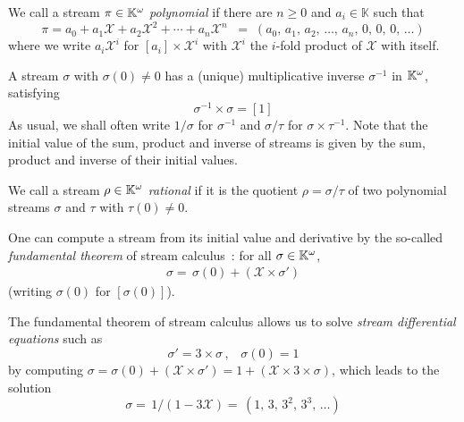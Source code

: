 \documentclass[3p]{elsarticle}
\newcommand{\X}{\mathcal{X}}           %
\newcommand{\streamproduct}{\times} %
\newcommand{\K}{\mathbb{K}}            %
\begin{document}
We call a stream $\pi \in \K\sp{\omega}$ {\em polynomial\/} if there
are $n \geq 0$ and $a_i \in \K$ such that
\[
\pi = a_0 + a_1 \X + a_2 \X^2 + \cdots + a_n  \X^n \;\; = \; (a_0,\,
a_1 ,\, a_2 ,\, \ldots ,\, a_n , \, 0, \, 0, \, 0, \, \ldots )
\]
where we write $a_i\X^i$ for $[a_i] \streamproduct \X^i$ with $\X^i$
the $i$-fold product of $\X$ with itself.

A stream $\sigma$ with $\sigma(0)\neq 0$ has a (unique)
multiplicative inverse $\sigma^{-1}$ in $\K\sp{\omega}$, satisfying
\[
\sigma^{-1} \streamproduct \sigma = [1]
\]
As usual, we shall often write $1/\sigma$ for $\sigma^{-1}$ and
$\sigma / \tau$ for $\sigma \streamproduct \tau^{-1}$.  Note that
the initial value of the sum, product and inverse of streams is
given by the sum, product and inverse of their initial values.

We call a stream $\rho\in \K\sp{\omega}$ {\em rational\/} if it is
the quotient $\rho = \sigma/\tau$ of two polynomial streams $\sigma$
and $\tau$ with $\tau(0) \neq 0$.

One can compute a stream from its initial value and derivative by
the so-called \emph{fundamental theorem} of stream
calculus~\cite{Rut05b}: for all $\sigma \in \K\sp{\omega}$,
\begin{eqnarray}
\label{fundamental_theorem_of_stream_calculus}\sigma = \, \sigma(0)
+ (\X \streamproduct
\sigma')
\end{eqnarray}
(writing $\sigma(0)$ for $[\sigma(0)]$).

%
The fundamental theorem of stream calculus allows us to solve
\emph{stream differential equations} such as
\[
\sigma'= 3\streamproduct \sigma \, , \;\;\; \sigma(0) = 1
\]
by computing $\sigma = \sigma(0) + (\X \streamproduct \sigma') = 1+
(\X \streamproduct 3 \streamproduct \sigma )$, which leads to the
solution
\[
\sigma = \, 1/(1-3\X) = \, (1,\, 3 , \, 3^2 , \, 3^3 , \, \ldots )
\]
\end{document}
